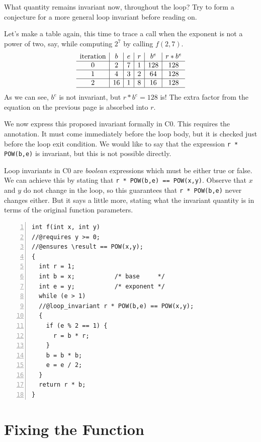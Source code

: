 \noindent
What quantity remains invariant now, throughout the loop?
Try to form a conjecture for a more general loop invariant
before reading on.

\clearpage
Let's make a table again, this time to trace a call when the
exponent is not a power of two, say, while computing $2^7$
by calling $f(2,7)$.
$$
\begin{array}{c|c|c|c|c|c}
  \text{iteration} & b  & e & r & b^e & r * b^e
\\ \hline        0 & 2  & 7 & 1 & 128 & 128
\\ \hline        1 & 4  & 3 & 2 & 64  & 128
\\ \hline        2 & 16 & 1 & 8 & 16  & 128
\\ \hline
\end{array}
$$
As we can see, $b^e$ is not invariant, but $r * b^e = 128$ is!
The extra factor from the equation on the previous page is
absorbed into $r$.

We now express this proposed invariant formally in C0.  This requires the
\loopinvariant{} annotation.  It must come immediately before the loop body,
but it is checked just before the loop exit condition.  We would like to say
that the expression \lstinline'r * POW(b,e)' is invariant, but this is not
possible directly.

Loop invariants in C0 are \emph{boolean} expressions which must be
either true or false.  We can achieve this by stating that
\lstinline'r * POW(b,e) == POW(x,y)'.  Observe that $x$ and $y$ do not
change in the loop, so this guarantees that \lstinline'r * POW(b,e)' never
changes either.  But it says a little more, stating what the
invariant quantity is in terms of the original function parameters.

\begin{lstlisting}[language={[C0]C}, numbers=left]
int f(int x, int y)
//@requires y >= 0;
//@ensures \result == POW(x,y);
{
  int r = 1;
  int b = x;           /* base     */
  int e = y;           /* exponent */
  while (e > 1)
  //@loop_invariant r * POW(b,e) == POW(x,y);
  {
    if (e % 2 == 1) {
      r = b * r;
    }
    b = b * b;
    e = e / 2;
  }
  return r * b;
}
\end{lstlisting}


\clearpage
\section{Fixing the Function}
\label{sec:contracts:fixing_bug}


